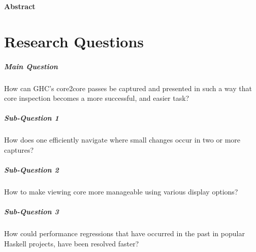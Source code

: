 \documentclass{report}
\begin{document}
\vspace*{\fill}
\begin{center}
\begin{minipage}{.7\textwidth}
\centerline{\textbf{Abstract}}

\end{minipage}
\end{center}
\vfill %

\thispagestyle{empty}

\newpage
\clearpage
{}
\tableofcontents

\newpage
\clearpage
{}

\newpage



\chapter{Research Questions}


\paragraph{Main Question} 
How can GHC’s core2core passes be captured and presented in such a way that core
inspection becomes a more successful, and easier task?

\hfill \break

\paragraph{Sub-Question 1} 
How does one efficiently navigate where small changes occur in two or more captures?

\paragraph{Sub-Question 2}
How to make viewing core more manageable using various display options?

\paragraph{Sub-Question 3}
How could performance regressions that have occurred in the past in popular Haskell projects,
have been resolved faster?


\newpage



\newpage
\end{document}
